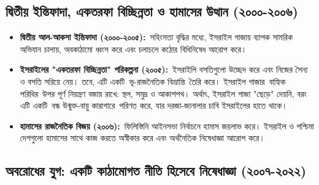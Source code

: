 \subsection{দ্বিতীয় ইন্তিফাদা, একতরফা বিচ্ছিন্নতা ও হামাসের উত্থান
(২০০০-২০০৬)}\label{ux9a6ux9acux9a4ux9df-ux987ux9a8ux9a4ux9abux9a6-ux98fux995ux9a4ux9b0ux9ab-ux9acux99aux99bux9a8ux9a8ux9a4-ux993-ux9b9ux9aeux9b8ux9b0-ux989ux9a4ux9a5ux9a8-ux9e8ux9e6ux9e6ux9e6-ux9e8ux9e6ux9e6ux9ec}

\begin{itemize}
\item
  \textbf{দ্বিতীয় আল-আকসা ইন্তিফাদা (২০০০-২০০৫):}~সহিংসতা বৃদ্ধির মধ্যে,
  ইসরাইল গাজায় ব্যাপক সামরিক অভিযান চালায়, অবকাঠামো ধ্বংস করে এবং চলাচলে
  কঠোর বিধিনিষেধ আরোপ করে।
\item
  \textbf{ইসরাইলের "একতরফা বিচ্ছিন্নতা" পরিকল্পনা (২০০৫):}~ইসরাইলি বসতিগুলো
  উচ্ছেদ করে এবং নিজের সৈন্য ও বসতি সরিয়ে নেয়। তবে, এটি একটি~ভূ-রাজনৈতিক
  বিভ্রান্তি~তৈরি করে। ইসরাইল গাজার~বাহ্যিক পরিধির~উপর পূর্ণ নিয়ন্ত্রণ বজায়
  রাখে: স্থল, সমুদ্র ও আকাশপথ। অর্থাৎ, ইসরাইল গাজা "ছেড়ে" দেয়নি, বরং এটি
  একটি~বন্ধ উন্মুক্ত-বায়ু কারাগারে~পরিণত করে, যার দরজা-জানালার চাবি ইসরাইলের
  হাতে থাকে।
\item
  \textbf{হামাসের রাজনৈতিক বিজয় (২০০৬):}~ফিলিস্তিনি আইনসভা নির্বাচনে হামাস
  জয়লাভ করে। ইসরাইল ও পশ্চিমা দেশগুলো হামাসের সাথে কাজ করতে অস্বীকার করে
  এবং অর্থনৈতিক নিষেধাজ্ঞা আরোপ করে।
\end{itemize}
\vspace{0.3em}

\subsection{অবরোধের যুগ: একটি কাঠামোগত নীতি হিসেবে নিষেধাজ্ঞা
(২০০৭-২০২২)}\label{ux985ux9acux9b0ux9a7ux9b0-ux9afux997-ux98fux995ux99f-ux995ux9a0ux9aeux997ux9a4-ux9a8ux9a4-ux9b9ux9b8ux9ac-ux9a8ux9b7ux9a7ux99cux99e-ux9e8ux9e6ux9e6ux9ed-ux9e8ux9e6ux9e8ux9e8}


